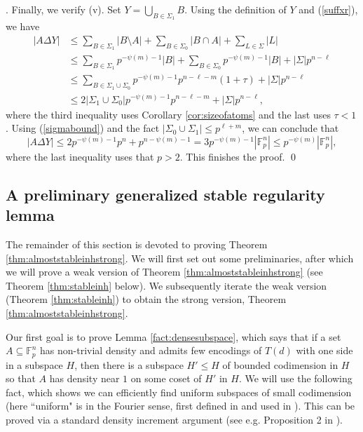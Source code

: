 \documentclass[12pt,oneside,british,a4wide]{amsart}
\numberwithin{equation}{section}
\theoremstyle{definition}
\def\F{\mathbb{F}}
\newenvironment{proofof}[1]{\indent{\itshape Proof of #1}.\;}{\qed}
\begin{document}
\begin{proofof}{Theorem \ref{thm:fop}}
Finally, we verify (v). Set $Y=\bigcup_{B\in \Sigma_1}B$.  Using the definition of $Y$ and (\ref{suffxr}), we have
\begin{align*}
|A\Delta Y|&\leq \sum_{B\in \Sigma_1}|B\setminus A|+\sum_{B\in \Sigma_0}|B\cap A|+\sum_{L\in \Sigma}|L|\\
&\leq \sum_{B\in \Sigma_1}p^{-\psi(m)-1}|B|+ \sum_{B\in \Sigma_0}p^{-\psi(m)-1}|B|+|\Sigma|p^{n-\ell}\\
&\leq  \sum_{B\in \Sigma_1\cup \Sigma_0}p^{-\psi(m)-1}p^{n-\ell-m}(1+\tau)+|\Sigma|p^{n-\ell}\\
& \leq 2|\Sigma_1\cup \Sigma_0|p^{-\psi(m)-1}p^{n-\ell-m}+|\Sigma|p^{n-\ell},
\end{align*}
where the third inequality uses Corollary \ref{cor:sizeofatoms} and the last uses $\tau<1$.  Using (\ref{sigmabound}) and the fact $|\Sigma_0\cup \Sigma_1|\leq p^{\ell+m}$, we can conclude that
$$
|A\Delta Y|\leq 2p^{-\psi(m)-1}p^{n}+p^{n-\psi(m)-1}=3p^{-\psi(m)-1}|\F_p^n|\leq p^{-\psi(m)}|\F_p^n|,
$$
where the last inequality uses that $p>2$.  This finishes the proof.
\end{proofof}

\subsection{A preliminary generalized stable regularity lemma}\label{sec:stablereg}

The remainder of this section is devoted to proving Theorem \ref{thm:almoststableinhstrong}.  We will first set out some preliminaries, after which we will prove a weak version of Theorem \ref{thm:almoststableinhstrong} (see Theorem \ref{thm:stableinh} below).  We subsequently iterate the weak version (Theorem \ref{thm:stableinh}) to obtain the strong version, Theorem \ref{thm:almoststableinhstrong}. 

Our first goal is to prove Lemma \ref{fact:densesubspace}, which says that if a set $A\subseteq \F_p^n$ has non-trivial density and admits few encodings of $T(d)$ with one side in a subspace $H$, then there is a subspace $H'\leqslant H$ of bounded codimension in $H$ so that $A$ has density near $1$  on some coset of $H'$ in $H$.  We will  use the following fact, which shows we can efficiently find uniform subspaces of small codimension (here ``uniform" is in the Fourier sense, first defined in \cite{Green.2005} and used in \cite{Terry.2019}). This can be proved via a standard density increment argument (see e.g. Proposition 2 in \cite{Terry.2019}). 
\end{document}
